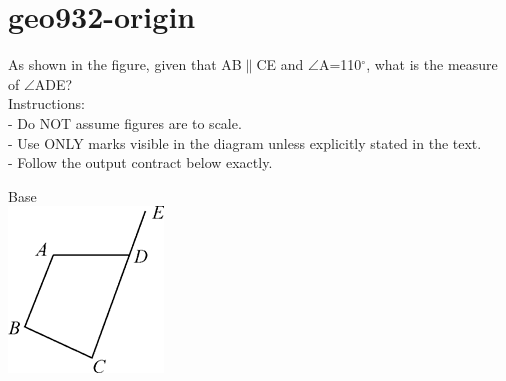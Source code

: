 \documentclass[12pt]{article}
\begin{document}
\section*{geo932-origin}
\noindent\begin{minipage}{\textwidth}
\setlength{\parskip}{4pt}
As shown in the figure, given that AB\ensuremath{\parallel }CE and \ensuremath{\angle }A=110\ensuremath{^\circ}, what is the measure of \ensuremath{\angle }ADE?\\
Instructions:\\
- Do NOT assume figures are to scale.\\
- Use ONLY marks visible in the diagram unless explicitly stated in the text.\\
- Follow the output contract below exactly.\\
\end{minipage}
\begin{center}
\begin{minipage}{0.32\textwidth}\centering
Base\\
\includegraphics[width=0.95\linewidth]{out_rommath_origin/items/geo932-origin/assets/figure.png}
\end{minipage}
\par
\end{center}
\bigskip
\end{document}
